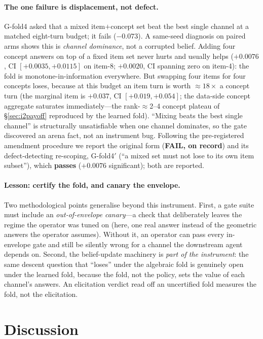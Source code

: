 \documentclass[11pt]{article}
\begin{document}
\paragraph{The one failure is displacement, not defect.} G-fold4 asked that a mixed item$+$concept set beat
the best single channel at a matched eight-turn budget; it fails ($-0.073$). A same-seed diagnosis on paired
arms shows this is \emph{channel dominance}, not a corrupted belief. Adding four concept answers on top of a
fixed item set never hurts and usually helps ($+0.0076$, CI $[+0.0035,+0.0115]$ on item-8; $+0.0020$, CI
spanning zero on item-4): the fold is monotone-in-information everywhere. But swapping four items for four
concepts loses, because at this budget an item turn is worth $\approx18\times$ a concept turn (the marginal
item is $+0.037$, CI $[+0.019,+0.054]$; the data-side concept aggregate saturates immediately---the
rank-$\approx$2--4 concept plateau of \S\ref{sec:i2payoff} reproduced by the learned fold). ``Mixing beats the
best single channel'' is structurally unsatisfiable when one channel dominates, so the gate discovered an
arena fact, not an instrument bug. Following the pre-registered amendment procedure we report the original
form (\textbf{FAIL, on record}) and its defect-detecting re-scoping, G-fold4$'$ (``a mixed set must not lose
to its own item subset''), which \textbf{passes} ($+0.0076$ significant); both are reported.

\paragraph{Lesson: certify the fold, and canary the envelope.} Two methodological points generalise beyond
this instrument. First, a gate suite must include an \emph{out-of-envelope canary}---a check that
deliberately leaves the regime the operator was tuned on (here, one real answer instead of the geometric
answers the operator assumes). Without it, an operator can pass every in-envelope gate and still be silently
wrong for a channel the downstream agent depends on. Second, the belief-update machinery is \emph{part of the
instrument}: the same descent question that ``loses'' under the algebraic fold is genuinely open under the
learned fold, because the fold, not the policy, sets the value of each channel's answers. An elicitation
verdict read off an uncertified fold measures the fold, not the elicitation.

\section{Discussion}\label{sec:disc}
\end{document}
